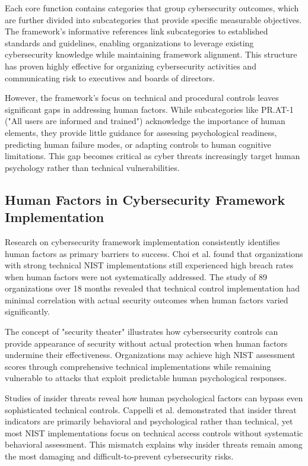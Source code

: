 \documentclass[10pt, twocolumn]{article}
\begin{document}
Each core function contains categories that group cybersecurity outcomes, which are further divided into subcategories that provide specific measurable objectives. The framework's informative references link subcategories to established standards and guidelines, enabling organizations to leverage existing cybersecurity knowledge while maintaining framework alignment. This structure has proven highly effective for organizing cybersecurity activities and communicating risk to executives and boards of directors.

However, the framework's focus on technical and procedural controls leaves significant gaps in addressing human factors. While subcategories like PR.AT-1 ("All users are informed and trained") acknowledge the importance of human elements, they provide little guidance for assessing psychological readiness, predicting human failure modes, or adapting controls to human cognitive limitations. This gap becomes critical as cyber threats increasingly target human psychology rather than technical vulnerabilities.

\subsection{Human Factors in Cybersecurity Framework Implementation}

Research on cybersecurity framework implementation consistently identifies human factors as primary barriers to success. Choi et al.\cite{choi2022} found that organizations with strong technical NIST implementations still experienced high breach rates when human factors were not systematically addressed. The study of 89 organizations over 18 months revealed that technical control implementation had minimal correlation with actual security outcomes when human factors varied significantly.

The concept of "security theater"\cite{schneier2003} illustrates how cybersecurity controls can provide appearance of security without actual protection when human factors undermine their effectiveness. Organizations may achieve high NIST assessment scores through comprehensive technical implementations while remaining vulnerable to attacks that exploit predictable human psychological responses.

Studies of insider threats reveal how human psychological factors can bypass even sophisticated technical controls. Cappelli et al.\cite{cappelli2012} demonstrated that insider threat indicators are primarily behavioral and psychological rather than technical, yet most NIST implementations focus on technical access controls without systematic behavioral assessment. This mismatch explains why insider threats remain among the most damaging and difficult-to-prevent cybersecurity risks.
\end{document}
